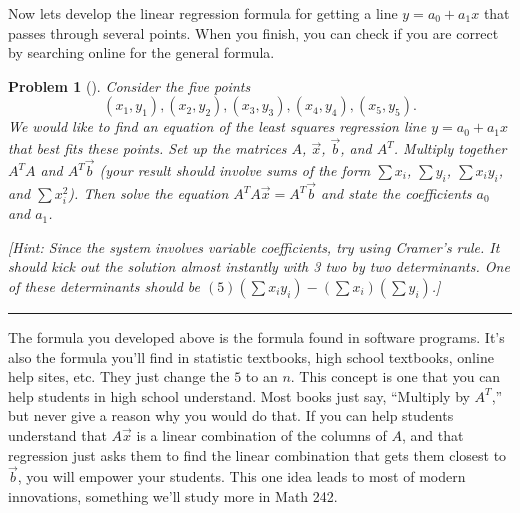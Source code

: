 \documentclass[letterpaper,oneside]{book}%
\theoremstyle{plain}
\theoremstyle{box}
\theoremstyle{problem}
\newtheorem{problemnum}{Problem}[chapter]
\newenvironment{problem}[1][]{\begin{problemnum}[#1]}{\end{problemnum}\nopagebreak\hrule\bigskip}
\begin{document}
Now lets develop the linear regression formula for getting a line $y=a_0+a_1x$ that passes through several points.  When you finish, you can check if you are correct by searching online for the general formula. 


\begin{problem}
 Consider the five points 
 $$
 (x_1,y_1),
 (x_2,y_2),
 (x_3,y_3),
 (x_4,y_4),
 (x_5,y_5).
$$
We would like to find an equation of the least squares regression line $y=a_0+a_1x$ that best fits these points. 
Set up the matrices $A$, $\vec x$, $\vec b$, and $A^T$. Multiply together $A^TA$ and $A^T\vec b$ (your result should involve sums of the form $\sum x_i$, $\sum y_i$, $\sum x_iy_i$, and $\sum x_i^2$). Then solve the equation $A^TA\vec x = A^T\vec b$ and state the coefficients $a_0$ and $a_1$. 

[Hint: Since the system involves variable coefficients, try using Cramer's rule. It should kick out the solution almost instantly with 3 two by two determinants. One of these determinants should be $(5)\left(\sum x_iy_i\right) - \left(\sum x_i\right)\left(\sum y_i\right)$.]
\end{problem}

The formula you developed above is the formula found in software programs.  It's also the formula you'll find in statistic textbooks, high school textbooks, online help sites, etc.  They just change the $5$ to an $n$.  This concept is one that you can help students in high school understand.  Most books just say, ``Multiply by $A^T$,'' but never give a reason why you would do that.  If you can help students understand that $A\vec x$ is a linear combination of the columns of $A$, and that regression just asks them to find the linear combination that gets them closest to $\vec b$, you will empower your students.  This one idea leads to most of modern innovations, something we'll study more in Math 242.
\end{document}
